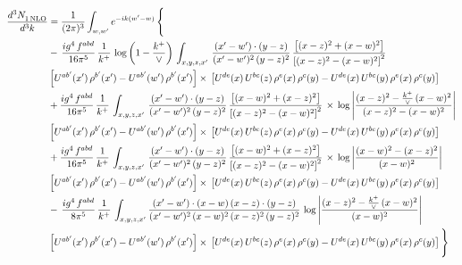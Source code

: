 \documentclass[9pt]{article}
\numberwithin{equation}{section}
\begin{document}
\begin{align}
   \frac{d^{3}N_{1\,\rm NLO}^{\rm}}{d^{3}k}  & =  \frac{1}{(2\pi)^{3}}  \int_{w, w^\prime} e^{-ik(w^\prime-w)}\, \Bigg\{\notag \\
& -\,\frac{ig^{4}\,f^{abd}}{16\pi^{5}}\,\frac{1}{k^{+}}\,\log{\left(1-\frac{k^{+}}{\vee}\right)}\,\int_{x,y,z,x'}\, \frac{(x'-w')\cdot (y-z)}{(x'-w')^{2}\,(y-z)^{2}}\,\frac{\left[(x-z)^{2}+(x-w)^{2}\right]}{\left[(x-z)^{2}-(x-w)^{2}\right]^{2}}\notag \\ & \left[U^{ab'}(x')\,\rho^{b'}(x')-U^{ab'}(w')\, \rho^{b'}(x')\right]\times\, \left[U^{de}(x)\,U^{bc}(z)\, \rho^{e}(x)\,\rho^{c}(y)-U^{de}(x)\,U^{bc}(y)\,\rho^{e}(x)\,\rho^{c}(y)\right] \notag \\
&  +\frac{ig^{4}\,f^{abd}}{16\pi^{5}}\, \frac{1}{k^{+}}\,\int_{x,y,z,x'}\, \frac{(x'-w')\cdot (y-z)}{(x'-w')^{2}\,(y-z)^{2}}\, \frac{\left[(x-w)^{2}+(x-z)^{2}\right]}{\left[(x-z)^{2}-(x-w)^{2}\right]^{2}}\, \times\, \log{\left|\frac{(x-z)^{2}-\frac{k^{+}}{\vee}\,(x-w)^{2}}{(x-z)^{2}-(x-w)^{2}}\right|}\notag \\ & \left[U^{ab'}(x')\,\rho^{b'}(x')-U^{ab'}(w')\, \rho^{b'}(x')\right]\times\, \left[U^{de}(x)\,U^{bc}(z)\, \rho^{e}(x)\,\rho^{c}(y)-U^{de}(x)\,U^{bc}(y)\,\rho^{e}(x)\,\rho^{c}(y)\right] \notag \\
&  +\frac{ig^{4}\,f^{abd}}{16\pi^{5}}\, \frac{1}{k^{+}}\,\int_{x,y,z,x'}\, \frac{(x'-w')\cdot (y-z)}{(x'-w')^{2}\,(y-z)^{2}}\, \frac{\left[(x-w)^{2}+(x-z)^{2}\right]}{\left[(x-z)^{2}-(x-w)^{2}\right]^{2}}\, \times\, \log{\left|\frac{(x-w)^{2}-(x-z)^{2}}{(x-w)^{2}}\right|}\notag \\ & \left[U^{ab'}(x')\,\rho^{b'}(x')-U^{ab'}(w')\, \rho^{b'}(x')\right]\times\, \left[U^{de}(x)\,U^{bc}(z)\, \rho^{e}(x)\,\rho^{c}(y)-U^{de}(x)\,U^{bc}(y)\,\rho^{e}(x)\,\rho^{c}(y)\right] \notag \\
&-\, \frac{ig^{4}\,f^{abd}}{8\pi^{5}}\,\frac{1}{k^{+}}\,\int_{x,y,z,x'}\frac{(x'-w')\cdot (x-w)\, (x-z)\cdot (y-z)}{(x'-w')^{2}\, (x-w)^{2}\, (x-z)^{2}\, (y-z)^{2}}\,\log{\left|\frac{(x-z)^{2}-\frac{k^{+}}{\vee}\,(x-w)^{2}}{(x-w)^{2}}\right|} \notag \\ & \left[U^{ab'}(x')\,\rho^{b'}(x')-U^{ab'}(w')\, \rho^{b'}(x')\right]\times\, \left[U^{de}(x)\,U^{bc}(z)\, \rho^{e}(x)\,\rho^{c}(y)-U^{de}(x)\,U^{bc}(y)\,\rho^{e}(x)\,\rho^{c}(y)\right]\Bigg\}
\end{align}
\end{document}
